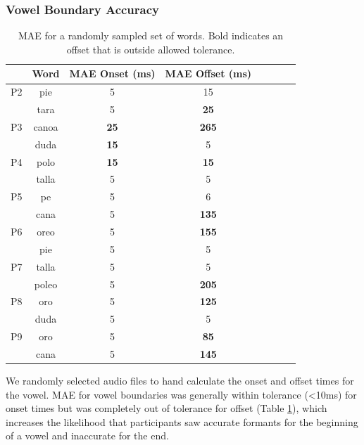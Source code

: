 \subsubsection{Vowel Boundary Accuracy}
\begin{table}[t]
    \centering
    \begin{tabular}{l|ccccccc}
    \hline
        ~ & Word & MAE Onset (ms) & MAE Offset (ms)\\ \hline
        P2 & pie & 5 & 15 \\ 
        ~ & tara & 5 & \textbf{25} \\ 
        P3 & canoa & \textbf{25} & \textbf{265} \\ 
        ~ & duda & \textbf{15} & 5 \\ 
        P4 & polo & \textbf{15} & \textbf{15} \\ 
        ~ & talla & 5 & 5 \\ 
        P5 & pe & 5 & 6 \\ 
        ~ & cana & 5 & \textbf{135} \\ 
        P6 & oreo & 5 & \textbf{155} \\ 
        ~ & pie & 5 & 5 \\ 
        P7 & talla & 5 & 5 \\ 
        ~ & poleo & 5 & \textbf{205} \\ 
        P8 & oro & 5 & \textbf{125} \\ 
        ~ & duda & 5 & 5 \\ 
        P9 & oro & 5 & \textbf{85} \\ 
        ~ & cana & 5 & \textbf{145} \\ 
    \end{tabular}
    \caption{MAE for a randomly sampled set of words. Bold indicates an offset that is outside allowed tolerance.}
    \label{tab:vwlBounds}
\end{table}
We randomly selected audio files to hand calculate the onset and offset times for the vowel. MAE for vowel boundaries was generally within tolerance (<10ms) for onset times but was completely out of tolerance for offset (Table \ref{tab:vwlBounds}), which increases the likelihood that participants saw accurate formants for the beginning of a vowel and inaccurate for the end. 

